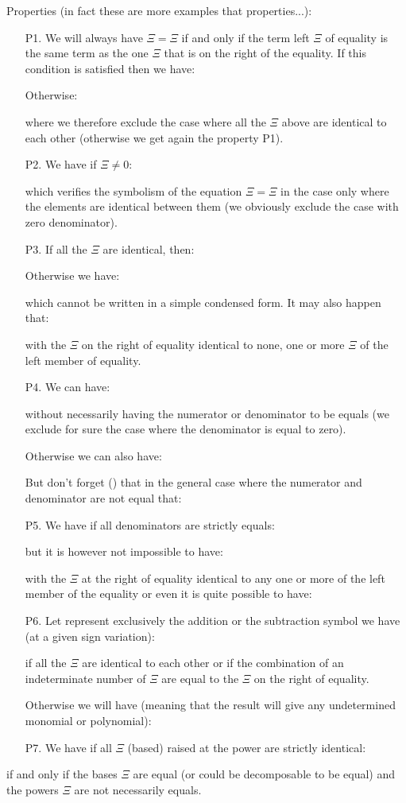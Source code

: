 	Properties (in fact these are more examples that properties...):
	\begin{enumerate}
		\item[P1.] We will always have $\Xi=\Xi$ if and only if the term left $\Xi$ of equality is the same term as the one $\Xi$  that is on the right of the equality. If this condition is satisfied then we have:
		
		Otherwise:
		
		where we therefore exclude the case where all the $\Xi$ above are identical to each other (otherwise we get again the property P1).
		\item[P2.] We have if $\Xi\neq 0$:
		
		which verifies the symbolism of the equation $\Xi=\Xi$ in the case only where the elements are identical between them (we obviously exclude the case with zero denominator).
	
		\item[P3.] \label{power rules calculations}If all the $\Xi$  are identical, then:
				
		Otherwise we have:
		
		which cannot be written in a simple condensed form. It may also happen that:
		
		with the $\Xi$ on the right of equality identical to none, one or more $\Xi$ of the left member of equality.

		\item[P4.] We can have:
		
		without necessarily having the numerator or denominator to be equals (we exclude for sure the case where the denominator is equal to zero).

		Otherwise we can also have:
		
		But don't forget () that in the general case where the numerator and denominator are not equal that:
		
		
		\item[P5.] We have if all denominators are strictly equals:
		
but it is however not impossible to have:
		
with the $\Xi$ at the right of equality identical to any one or more of the left member of the equality or even it is quite possible to have:
		

		\item[P6.] Let represent exclusively the addition or the subtraction symbol we have (at a given sign variation):
		
if all the $\Xi$ are identical to each other or if the combination of an indeterminate number of $\Xi$ are equal to the $\Xi$ on the right of equality.

		Otherwise we will have (meaning that the result will give any undetermined monomial or polynomial):
		

		\item[P7.] We have if all $\Xi$ (based) raised at the power are strictly identical:
		
	\end{enumerate}
	if and only if the bases $\Xi$ are equal (or could be decomposable to be equal) and the powers $\Xi$ are not  necessarily equals.

